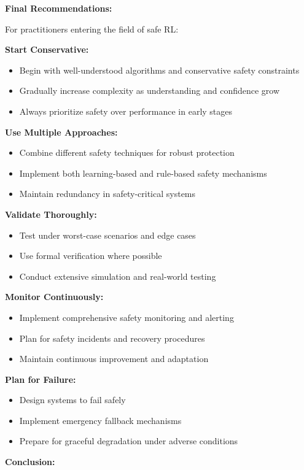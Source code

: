 \documentclass[12pt]{article}
\begin{document}
{{{{\textbf{Final Recommendations:}

For practitioners entering the field of safe RL:

\textbf{Start Conservative:}
\begin{itemize}
\item Begin with well-understood algorithms and conservative safety constraints
\item Gradually increase complexity as understanding and confidence grow
\item Always prioritize safety over performance in early stages
\end{itemize}

\textbf{Use Multiple Approaches:}
\begin{itemize}
\item Combine different safety techniques for robust protection
\item Implement both learning-based and rule-based safety mechanisms
\item Maintain redundancy in safety-critical systems
\end{itemize}

\textbf{Validate Thoroughly:}
\begin{itemize}
\item Test under worst-case scenarios and edge cases
\item Use formal verification where possible
\item Conduct extensive simulation and real-world testing
\end{itemize}

\textbf{Monitor Continuously:}
\begin{itemize}
\item Implement comprehensive safety monitoring and alerting
\item Plan for safety incidents and recovery procedures
\item Maintain continuous improvement and adaptation
\end{itemize}

\textbf{Plan for Failure:}
\begin{itemize}
\item Design systems to fail safely
\item Implement emergency fallback mechanisms
\item Prepare for graceful degradation under adverse conditions
\end{itemize}

\textbf{Conclusion:}

}}}}
\end{document}
